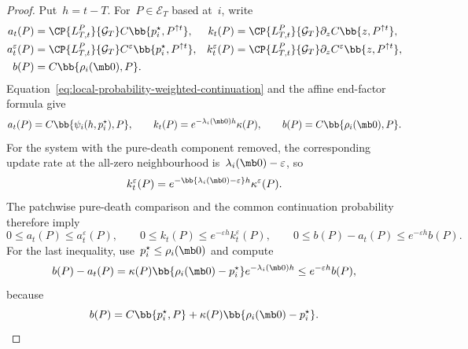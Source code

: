 \begin{proof}
Put~$h=t-T$. For~$P\in\mathcal E_T$ based at~$i$, write
\begin{align*}
a_t(P)
&=
\CP{L_{T,t}^P}{\mathcal G_T}
C\bb{p_i^\star,P^{\uparrow t}},
&
k_t(P)
&=
\CP{L_{T,t}^P}{\mathcal G_T}
\partial_zC\bb{z,P^{\uparrow t}},
\\
a_t^\varepsilon(P)
&=
\CP{L_{T,t}^P}{\mathcal G_T}
C^\varepsilon\bb{p_i^\star,P^{\uparrow t}},
&
k_t^\varepsilon(P)
&=
\CP{L_{T,t}^P}{\mathcal G_T}
\partial_zC^\varepsilon\bb{z,P^{\uparrow t}},
\\
b(P)&=C\bb{\rho_i(\mb 0),P}.
\end{align*}
Equation~\eqref{eq:local-probability-weighted-continuation} and the affine
end-factor formula give
\begin{equation*}
a_t(P)=C\bb{\psi_i(h,p_i^\star),P},
\qquad
k_t(P)=e^{-\lambda_i(\mb 0)h}\kappa(P),
\qquad
b(P)=C\bb{\rho_i(\mb 0),P}.
\end{equation*}
For the system with the pure-death component removed, the corresponding update
rate at the all-zero neighbourhood is~$\lambda_i(\mb 0)-\varepsilon$, so
\begin{equation*}
k_t^\varepsilon(P)
=
e^{-\bb{\lambda_i(\mb 0)-\varepsilon}h}\kappa^\varepsilon(P).
\end{equation*}
The patchwise pure-death comparison and the common continuation probability
therefore imply
\begin{equation}
\label{eq:appendix-continued-factor-comparisons}
0\leq a_t(P)\leq a_t^\varepsilon(P),
\qquad
0\leq k_t(P)\leq e^{-\varepsilon h}k_t^\varepsilon(P),
\qquad
0\leq b(P)-a_t(P)\leq e^{-\varepsilon h}b(P).
\end{equation}
For the last inequality, use~$p_i^\star\leq\rho_i(\mb 0)$ and compute
\begin{equation*}
b(P)-a_t(P)
=
\kappa(P)\bb{\rho_i(\mb 0)-p_i^\star}
e^{-\lambda_i(\mb 0)h}
\leq
e^{-\varepsilon h}b(P),
\end{equation*}
because
\begin{equation*}
b(P)
=
C\bb{p_i^\star,P}
+
\kappa(P)\bb{\rho_i(\mb 0)-p_i^\star}.
\end{equation*}


\end{proof}

